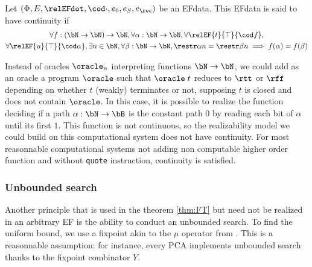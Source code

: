 \begin{definition}[Continuity]
  Let $(\Phi,E,\relEFdot, \cod\cdot, e_0,e_S,e_{\rec})$ be an EFdata. This EFdata is said to have continuity if
  \begin{multline*}
    \forall f : (\bN \to \bN) \to \bN, \forall \alpha : \bN \to \bN, \forall \relEF{t}{\top}{\cod f},
    \\\forall \relEF{u}{\top}{\cod \alpha}, \exists n \in \bN,
    \forall \beta:\bN\to\bN,\restr \alpha n = \restr \beta n \implies f(\alpha) = f(\beta)
  \end{multline*}
\end{definition}
\begin{example}
Instead of oracles $\oracle_n$ interpreting functions $\bN \to \bN$, we could add as an oracle a program $\oracle$ such that $\oracle\;t$ reduces to $\rtt$ or $\rff$ depending on whether $t$ (weakly) terminates or not, supposing $t$ is closed and does not contain $\oracle$. In this case, it is possible to realize the function deciding if a path $\alpha : \bN \to \bB$ is the constant path $0$ by reading each bit of $\alpha$ until its first $1$. This function is not continuous, so the realizability model we could build on this computational system does not have continuity. For most reasonnable computational systems not adding non computable higher order function and without \texttt{quote} instruction, continuity is satisfied.
\end{example}


\subsubsection{Unbounded search}

Another principle that is used in the theorem \ref{thm:FT} but need not be realized in an arbitrary EF is the ability to conduct an unbounded search. To find the uniform bound, we use a fixpoint akin to the $\mu$ operator from \cite{Kleene1943}. This is a reasonnable assumption: for instance, every PCA implements unbounded search thanks to the fixpoint combinator $Y$.


